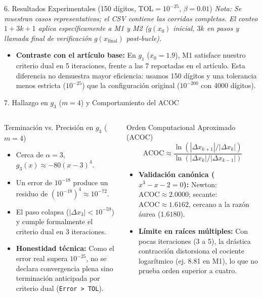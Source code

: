 \documentclass[aspectratio=169,10pt]{beamer}
\begin{document}
\begin{frame}{6. Resultados Experimentales (150 dígitos, $\mathrm{TOL}=10^{-25}$, $\beta=0.01$)}
  \vspace{-0.15cm}
  {\tiny \textit{Nota: Se muestran casos representativos; el CSV contiene las corridas completas. El conteo $1+3k+1$ aplica específicamente a M1 y M2 ($g(x_0)$ inicial, $3k$ en pasos y llamada final de verificación $g(x_{\mathrm{final}})$ post-bucle).}}
  \begin{itemize}
    \item \textbf{Contraste con el artículo base:} En $g_1$ ($x_0=1.9$), M1 satisface nuestro criterio dual en 5 iteraciones, frente a las 7 reportadas en el artículo. Esta diferencia no demuestra mayor eficiencia: usamos 150 dígitos y una tolerancia menos estricta ($10^{-25}$) que la configuración original ($10^{-200}$ con 4000 dígitos).
  \end{itemize}
\end{frame}

\begin{frame}{7. Hallazgo en $g_3$ ($m=4$) y Comportamiento del ACOC}
  \begin{columns}[T]
    \begin{block}{Terminación vs. Precisión en $g_3$ ($m=4$)}
      \footnotesize
      \begin{itemize}
        \item Cerca de $\alpha=3$, $g_3(x) \approx -80(x-3)^4$.
        \item Un error de $10^{-18}$ produce un residuo de $(10^{-18})^4 \approx 10^{-72}$.
        \item El paso colapsa ($|\Delta x_3| < 10^{-59}$) y cumple formalmente el criterio dual en 3 iteraciones.
        \item \alert{\textbf{Honestidad técnica:}} Como el error real supera $10^{-25}$, no se declara convergencia plena sino terminación anticipada por criterio dual (\texttt{Error > TOL}).
      \end{itemize}
    \end{block}
    \begin{block}{Orden Computacional Aproximado (ACOC)}
      \footnotesize
      $$\mathrm{ACOC} \approx \frac{\ln(|\Delta x_{k+1}|/|\Delta x_k|)}{\ln(|\Delta x_k|/|\Delta x_{k-1}|)}$$
      \begin{itemize}
        \item \textbf{Validación canónica ($x^3-x-2=0$):}
        Newton: $\mathrm{ACOC}\approx 2.0000$; secante: $\mathrm{ACOC}\approx 1.6162$, cercano a la razón áurea ($1.6180$).
        \item \textbf{Límite en raíces múltiples:} Con pocas iteraciones (3 a 5), la drástica contracción distorsiona el cociente logarítmico (ej. 8.81 en M1), lo que no prueba orden superior a cuatro.
      \end{itemize}
    \end{block}
  \end{columns}
\end{frame}
\end{document}
